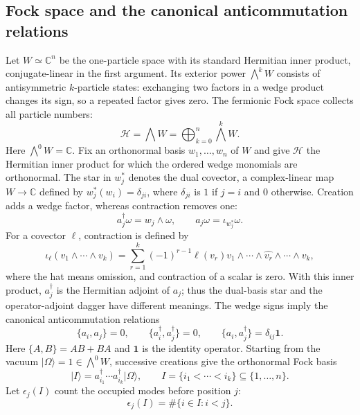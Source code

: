 \documentclass{article}
\theoremstyle{definition}
\theoremstyle{remark}
\newcommand{\vac}{|\Omega\rangle}
\newcommand{\C}{\mathbb C}
\newcommand{\ket}[1]{\lvert #1\rangle}
\begin{document}
\subsection{Fock space and the canonical anticommutation relations}
\label{sec:fock-car}
Let $W\simeq\C^n$ be the one-particle space with its standard Hermitian
inner product, conjugate-linear in the first argument. Its exterior power
$\bigwedge^kW$ consists of antisymmetric $k$-particle states: exchanging
two factors in a wedge product changes its sign, so a repeated factor gives
zero. The fermionic Fock space collects all particle numbers:
\begin{equation}
 \mathcal H=\bigwedge W
 =\bigoplus_{k=0}^{n}\bigwedge^k W .
\end{equation}
Here $\bigwedge^0W=\C$. Fix an orthonormal basis $w_1,\ldots,w_n$
of $W$ and give $\mathcal H$ the Hermitian inner product for which the
ordered wedge monomials are orthonormal. The star in $w_j^*$ denotes
the dual covector, a complex-linear map $W\to\C$ defined by
$w_j^*(w_i)=\delta_{ji}$, where $\delta_{ji}$ is $1$ if $j=i$ and $0$
otherwise. Creation adds a wedge
factor, whereas contraction removes one:
\begin{equation*}
 a_j^\dagger\omega=w_j\wedge\omega,
 \qquad
 a_j\omega=\iota_{w_j^*}\omega.
\end{equation*}
For a covector $\ell$, contraction is defined by
\[
 \iota_\ell(v_1\wedge\cdots\wedge v_k)
 =\sum_{r=1}^k(-1)^{r-1}\ell(v_r)
 v_1\wedge\cdots\wedge\widehat{v_r}\wedge\cdots\wedge v_k,
\]
where the hat means omission, and contraction of a scalar is zero.
With this inner product, $a_j^\dagger$ is the Hermitian adjoint of $a_j$;
thus the dual-basis star and the operator-adjoint dagger have different meanings.
The wedge signs imply the canonical anticommutation relations
\begin{equation}
 \{a_i,a_j\}=0,\qquad
 \{a_i^\dagger,a_j^\dagger\}=0,\qquad
 \{a_i,a_j^\dagger\}=\delta_{ij}\mathbf 1 .
 \label{eq:car}
\end{equation}
Here $\{A,B\}=AB+BA$ and $\mathbf1$ is the identity operator. Starting from the
vacuum $\vac=1\in\bigwedge^0W$, successive creations give the
orthonormal Fock basis
\begin{equation}
 \ket I
 =a_{i_1}^\dagger\cdots a_{i_k}^\dagger\vac,
 \qquad
 I=\{i_1<\cdots<i_k\}\subseteq\{1,\ldots,n\}.
 \label{basis_of_fock_space}
\end{equation}
Let $\epsilon_j(I)$ count the occupied modes before position $j$:
\begin{equation*}
 \epsilon_j(I)=\#\{i\in I:i<j\}.
\end{equation*}
\end{document}
